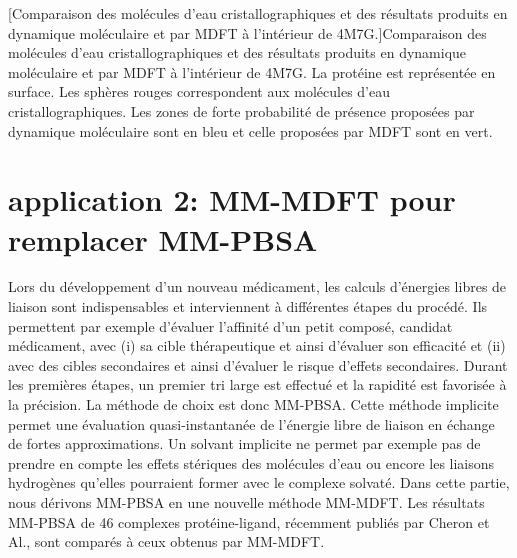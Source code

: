 \begin{center}
    \captionsetup{type=figure}
	[Comparaison des molécules d'eau cristallographiques et des résultats produits en dynamique moléculaire et par MDFT à l'intérieur de 4M7G.]{Comparaison des molécules d'eau cristallographiques et des résultats produits en dynamique moléculaire et par MDFT à l'intérieur de 4M7G. La protéine est représentée en surface. Les sphères rouges correspondent aux molécules d'eau cristallographiques. Les zones de forte probabilité de présence proposées par dynamique moléculaire sont en bleu et celle proposées par MDFT sont en vert.}
      \label{fig:interieur_water_molecule}
\end{center}




\clearpage
\section{application 2: MM-MDFT pour remplacer MM-PBSA}
Lors du développement d'un nouveau médicament, les calculs d'énergies libres de liaison sont indispensables et interviennent à différentes étapes du procédé. Ils permettent par exemple d'évaluer l'affinité d'un petit composé, candidat médicament, avec (i) sa cible thérapeutique et ainsi d'évaluer son efficacité et (ii) avec des cibles secondaires et ainsi d'évaluer le risque d'effets secondaires. Durant les premières étapes, un premier tri large est effectué et la rapidité est favorisée à la précision. La méthode de choix est donc MM-PBSA\cite{genheden_mm/pbsa_2015}. Cette méthode implicite permet une évaluation quasi-instantanée de l'énergie libre de liaison en échange de fortes approximations. Un solvant implicite ne permet par exemple pas de prendre en compte les effets stériques des molécules d'eau ou encore les liaisons hydrogènes qu'elles pourraient former avec le complexe solvaté. Dans cette partie, nous dérivons MM-PBSA en une nouvelle méthode MM-MDFT. Les résultats MM-PBSA de 46 complexes protéine-ligand, récemment publiés par Cheron et Al.\cite{cheron_effect_2017}, sont comparés à ceux obtenus par MM-MDFT.

